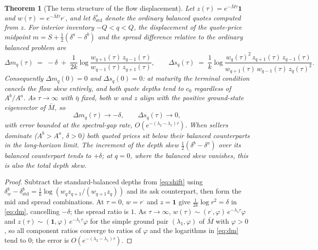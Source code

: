 \documentclass[11pt]{article}
\newtheorem{theorem}{Theorem}
\begin{document}
\begin{theorem}[The term structure of the flow displacement]\label{thm:term}
Let $z(\tau) = e^{-\bar M \tau}\mathbf{1}$ and $w(\tau) = e^{-\bar M \tau} r^{\cdot}$, and let $\delta^s_{\mathrm{std}}$ denote the ordinary balanced quotes computed from $z$. For interior inventory $-Q < q < Q$, the displacement of the quote-price midpoint $m = S + \tfrac12(\delta^a - \delta^b)$ and the spread difference relative to the ordinary balanced problem are
\begin{equation}\label{eq:dm}
\Delta m_q(\tau) \;=\; -\delta \;+\; \frac{1}{2k}\log\frac{w_{q+1}(\tau)\, z_{q-1}(\tau)}{w_{q-1}(\tau)\, z_{q+1}(\tau)},
\qquad
\Delta s_q(\tau) \;=\; \frac{1}{k}\log\frac{w_q(\tau)^2\, z_{q+1}(\tau)\, z_{q-1}(\tau)}{w_{q+1}(\tau)\, w_{q-1}(\tau)\, z_q(\tau)^2}.
\end{equation}
Consequently $\Delta m_q(0) = 0$ and $\Delta s_q(0) = 0$: at maturity the terminal condition cancels the flow skew entirely, and both quote depths tend to $c_0$ regardless of $A^b/A^a$. As $\tau \to \infty$ with $\bar\eta$ fixed, both $w$ and $z$ align with the positive ground-state eigenvector of $\bar M$, so
\[
\Delta m_q(\tau) \longrightarrow -\delta, \qquad \Delta s_q(\tau) \longrightarrow 0,
\]
with error bounded at the spectral-gap rate, $O(e^{-(\lambda_2-\lambda_1)\tau})$. When sellers dominate ($A^b > A^a$, $\delta > 0$) both quoted prices sit below their balanced counterparts in the long-horizon limit. The increment of the depth skew $\tfrac12(\delta^b - \delta^a)$ over its balanced counterpart tends to $+\delta$; at $q = 0$, where the balanced skew vanishes, this is also the total depth skew.
\end{theorem}

\begin{proof}
Subtract the standard-balanced depths from \eqref{eq:shift} using $\delta^b_{w} - \delta^b_{\mathrm{std}} = \tfrac1k \log(w_q z_{q+1}/(w_{q+1} z_q))$ and its ask counterpart, then form the mid and spread combinations. At $\tau = 0$, $w = r^{\cdot}$ and $z = \mathbf{1}$ give $\tfrac{1}{2k}\log r^2 = \delta$ in \eqref{eq:dm}, cancelling $-\delta$; the spread ratio is $1$. As $\tau \to \infty$, $w(\tau) \sim (r^{\cdot}, \varphi)\, e^{-\lambda_1 \tau} \varphi$ and $z(\tau) \sim (\mathbf{1}, \varphi)\, e^{-\lambda_1 \tau} \varphi$ for the simple ground pair $(\lambda_1, \varphi)$ of $\bar M$ with $\varphi > 0$, so all component ratios converge to ratios of $\varphi$ and the logarithms in \eqref{eq:dm} tend to $0$; the error is $O(e^{-(\lambda_2 - \lambda_1)\tau})$.
\end{proof}
\end{document}
